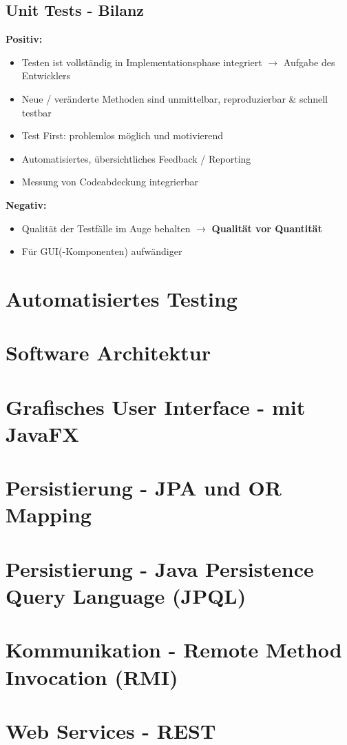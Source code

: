 \documentclass[a4paper]{article}
\begin{document}
		\subsection{Unit Tests - Bilanz}
		
		\textbf{Positiv:}
		\begin{itemize}
			\item Testen ist vollständig in Implementationsphase integriert $\rightarrow$ Aufgabe des Entwicklers
			\item Neue / veränderte Methoden sind unmittelbar, reproduzierbar \& schnell testbar
			\item Test First: problemlos möglich und motivierend
			\item Automatisiertes, übersichtliches Feedback / Reporting
			\item Messung von Codeabdeckung integrierbar
		\end{itemize}
		\textbf{Negativ:}
		\begin{itemize}
			\item Qualität der Testfälle im Auge behalten $\rightarrow$ \textbf{Qualität vor Quantität}
			\item Für GUI(-Komponenten) aufwändiger
		\end{itemize} 
		
	\newpage
	\section{Automatisiertes Testing}
	
		
	\newpage
	\section{Software Architektur}
		
		
	\newpage
	\section{Grafisches User Interface - mit JavaFX}	
		
		
	\newpage
	\section{Persistierung - JPA und OR Mapping}
	
		
	\newpage
	\section{Persistierung - Java Persistence Query Language (JPQL)}
		
		
	\newpage
	\section{Kommunikation - Remote Method Invocation (RMI)}
	
	
	\newpage
	\section{Web Services - REST}
	
		
		
\end{document}
